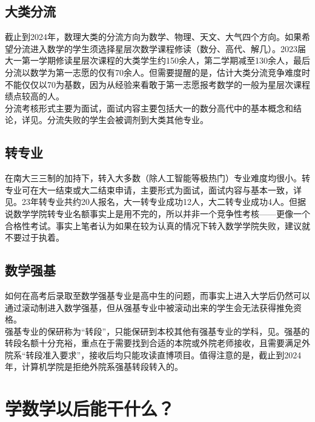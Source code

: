 \documentclass[a4paper,11pt,notitlepage]{article}
\begin{document}
\subsection{大类分流}\label{大类分流}
截止到2024年，数理大类的分流方向为数学、物理、天文、大气四个方向。如果希望分流进入数学的学生须选择星层次数学课程修读（数分、高代、解几）。2023届大一第一学期修读星层次课程的大类学生约150余人，第二学期减至130余人，最后分流以数学为第一志愿的仅有70余人。但需要提醒的是，估计大类分流竞争难度时不能仅仅以70为基数，因为从经验来看敢于第一志愿报考数学的一般为星层次课程绩点较高的人。\\
\indent 分流考核形式主要为面试，面试内容主要包括大一的数分高代中的基本概念和结论，详见。分流失败的学生会被调剂到大类其他专业。

\subsection{转专业}
在南大三三制的加持下，转入大多数（除人工智能等极热门）专业难度均很小。转专业可在大一结束或大二结束申请，主要形式为面试，面试内容与基本一致，详见。23年转专业共约20人报名，大一转专业成功12人，大二转专业成功4人。但据说数学学院转专业名额事实上是用不完的，所以并非一个竞争性考核——更像一个合格性考试。事实上笔者认为如果在较为认真的情况下转入数学学院失败，建议就不要过于执着。

\subsection{数学强基}
如何在高考后录取至数学强基专业是高中生的问题，而事实上进入大学后仍然可以通过滚动制进入数学强基，但从强基专业中被滚动出来的学生会无法获得推免资格。\\
\indent 强基专业的保研称为“转段”，只能保研到本校其他有强基专业的学科，见\cite{转段}。强基的转段名额十分充裕，重点在于需要找到合适的本院或外院老师接收，且需要满足外院系“转段准入要求”，接收后均只能攻读直博项目。值得注意的是，截止到2024年，计算机学院是拒绝外院系强基转段转入的。

\section{学数学以后能干什么？}
\end{document}
